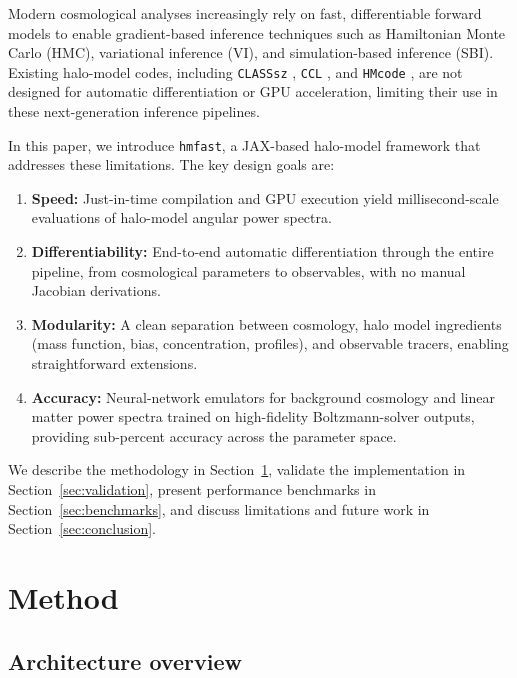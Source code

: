 \documentclass[12pt, preprint]{aastex631}
\begin{document}
Modern cosmological analyses increasingly rely on fast, differentiable forward models to enable gradient-based inference techniques such as Hamiltonian Monte Carlo (HMC), variational inference (VI), and simulation-based inference (SBI).
Existing halo-model codes, including \texttt{CLASSsz} \citep{Bolliet2018}, \texttt{CCL} \citep{CCL2019}, and \texttt{HMcode} \citep{Mead2021}, are not designed for automatic differentiation or GPU acceleration, limiting their use in these next-generation inference pipelines.

In this paper, we introduce \texttt{hmfast}, a JAX-based \citep{JAX2018} halo-model framework that addresses these limitations.
The key design goals are:
\begin{enumerate}
    \item \textbf{Speed:} Just-in-time compilation and GPU execution yield millisecond-scale evaluations of halo-model angular power spectra.
    \item \textbf{Differentiability:} End-to-end automatic differentiation through the entire pipeline, from cosmological parameters to observables, with no manual Jacobian derivations.
    \item \textbf{Modularity:} A clean separation between cosmology, halo model ingredients (mass function, bias, concentration, profiles), and observable tracers, enabling straightforward extensions.
    \item \textbf{Accuracy:} Neural-network emulators for background cosmology and linear matter power spectra trained on high-fidelity Boltzmann-solver outputs, providing sub-percent accuracy across the parameter space.
\end{enumerate}

We describe the methodology in Section~\ref{sec:method}, validate the implementation in Section~\ref{sec:validation}, present performance benchmarks in Section~\ref{sec:benchmarks}, and discuss limitations and future work in Section~\ref{sec:conclusion}.


\section{Method}
\label{sec:method}

\subsection{Architecture overview}
\end{document}
